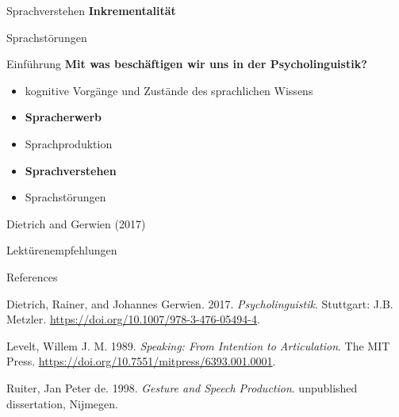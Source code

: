\documentclass[
  ignorenonframetext,
]{beamer}
\newlength{\cslhangindent}
\newenvironment{CSLReferences}[2] %
 {\begin{list}{}{%
  \setlength{\itemindent}{0pt}
  \setlength{\leftmargin}{0pt}
  \setlength{\parsep}{0pt}
  \ifodd #1
   \setlength{\leftmargin}{\cslhangindent}
   \setlength{\itemindent}{-1\cslhangindent}
  \fi
  \setlength{\itemsep}{#2\baselineskip}}}
 {\end{list}}
\begin{document}
\begin{frame}
\begin{block}{Sprachverstehen}
\label{sprachverstehen-1}
{\textbf{Inkrementalität}}
\end{block}
\end{frame}

\begin{frame}
\begin{block}{Sprachstörungen}
\label{sprachstuxf6rungen}
\end{block}

\begin{block}{Einführung}
\label{einfuxfchrung-1}
\textbf{Mit was beschäftigen wir uns in der Psycholinguistik?}

\begin{itemize}
\item
  kognitive Vorgänge und Zustände des sprachlichen Wissens
\item
  {\textbf{Spracherwerb}}
\item
  Sprachproduktion
\item
  {\textbf{Sprachverstehen}}
\item
  Sprachstörungen
\end{itemize}

Dietrich and Gerwien (2017)
\end{block}
\end{frame}

\begin{frame}{Lektürenempfehlungen}
\label{lektuxfcrenempfehlungen}
\end{frame}

\begin{frame}{References}
\label{references}
\label{refs}
\begin{CSLReferences}{1}{0}
Dietrich, Rainer, and Johannes Gerwien. 2017. \emph{Psycholinguistik}.
Stuttgart: J.B. Metzler.
\url{https://doi.org/10.1007/978-3-476-05494-4}.

Levelt, Willem J. M. 1989. \emph{Speaking: From Intention to
Articulation}. The MIT Press.
\url{https://doi.org/10.7551/mitpress/6393.001.0001}.

Ruiter, Jan Peter de. 1998. \emph{Gesture and Speech Production}.
unpublished dissertation, Nijmegen.

\end{CSLReferences}
\end{frame}
\end{document}
